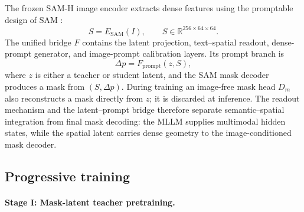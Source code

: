 The frozen SAM-H image encoder extracts dense features using the promptable design of SAM \cite{Kirillov2023SAM}:
\begin{equation}
  S=E_{\mathrm{SAM}}(I), \qquad S\in\mathbb{R}^{256\times64\times64}.
  \label{eq:sam_image_feature}
\end{equation}
The unified bridge $F$ contains the latent projection, text--spatial readout, dense-prompt generator, and image-prompt calibration layers. Its prompt branch is
\begin{equation}
  \Delta p=F_{\mathrm{prompt}}(z,S),
  \label{eq:prompt_interface}
\end{equation}
where $z$ is either a teacher or student latent, and the SAM mask decoder produces a mask from $(S,\Delta p)$. During training an image-free mask head $D_m$ also reconstructs a mask directly from $z$; it is discarded at inference. The readout mechanism and the latent--prompt bridge therefore separate semantic--spatial integration from final mask decoding: the MLLM supplies multimodal hidden states, while the spatial latent carries dense geometry to the image-conditioned mask decoder.

\subsection{Progressive training}
\label{sec:training}

\paragraph{Stage I: Mask-latent teacher pretraining.}
\label{sec:stage1}


